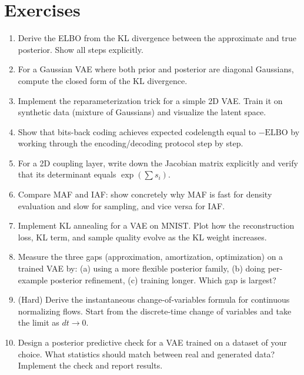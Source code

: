 \vspace{1.5em}

\section*{Exercises}
\begin{enumerate}
\item Derive the ELBO from the KL divergence between the approximate and true posterior. Show all steps explicitly.

\item For a Gaussian VAE where both prior and posterior are diagonal Gaussians, compute the closed form of the KL divergence.

\item Implement the reparameterization trick for a simple 2D VAE. Train it on synthetic data (mixture of Gaussians) and visualize the latent space.

\item Show that bits-back coding achieves expected codelength equal to $-\text{ELBO}$ by working through the encoding/decoding protocol step by step.

\item For a 2D coupling layer, write down the Jacobian matrix explicitly and verify that its determinant equals $\exp(\sum s_i)$.

\item Compare MAF and IAF: show concretely why MAF is fast for density evaluation and slow for sampling, and vice versa for IAF.

\item Implement KL annealing for a VAE on MNIST. Plot how the reconstruction loss, KL term, and sample quality evolve as the KL weight increases.

\item Measure the three gaps (approximation, amortization, optimization) on a trained VAE by: (a) using a more flexible posterior family, (b) doing per-example posterior refinement, (c) training longer. Which gap is largest?

\item (Hard) Derive the instantaneous change-of-variables formula for continuous normalizing flows. Start from the discrete-time change of variables and take the limit as $dt \to 0$.

\item Design a posterior predictive check for a VAE trained on a dataset of your choice. What statistics should match between real and generated data? Implement the check and report results.
\end{enumerate}

\vspace{2em}
